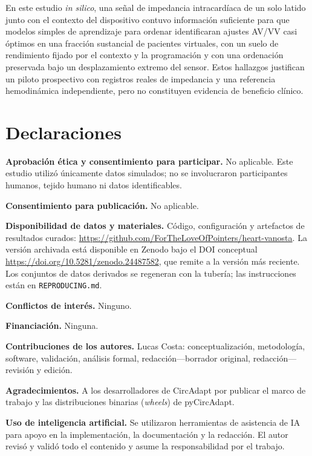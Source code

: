 \documentclass[11pt,a4paper]{article}
\begin{document}
En este estudio \emph{in silico}, una señal de impedancia intracardíaca de un solo
latido junto con el contexto del dispositivo contuvo información suficiente para
que modelos simples de aprendizaje para ordenar identificaran ajustes AV/VV casi
óptimos en una fracción sustancial de pacientes virtuales, con un suelo de
rendimiento fijado por el contexto y la programación y con una ordenación
preservada bajo un desplazamiento extremo del sensor. Estos hallazgos justifican
un piloto prospectivo con registros reales de impedancia y una referencia
hemodinámica independiente, pero no constituyen evidencia de beneficio clínico.

\section*{Declaraciones}

\noindent\textbf{Aprobación ética y consentimiento para participar.} No
aplicable. Este estudio utilizó únicamente datos simulados; no se involucraron
participantes humanos, tejido humano ni datos identificables.

\noindent\textbf{Consentimiento para publicación.} No aplicable.

\noindent\textbf{Disponibilidad de datos y materiales.} Código, configuración y
artefactos de resultados curados:
\url{https://github.com/ForTheLoveOfPointers/heart-vanosta}. La versión archivada
está disponible en Zenodo bajo el DOI conceptual
\url{https://doi.org/10.5281/zenodo.24487582}, que remite a la versión más
reciente. Los conjuntos de datos derivados se regeneran con la tubería; las
instrucciones están en \texttt{REPRODUCING.md}.

\noindent\textbf{Conflictos de interés.} Ninguno.

\noindent\textbf{Financiación.} Ninguna.

\noindent\textbf{Contribuciones de los autores.} Lucas Costa: conceptualización,
metodología, software, validación, análisis formal, redacción---borrador
original, redacción---revisión y edición.

\noindent\textbf{Agradecimientos.} A los desarrolladores de CircAdapt por
publicar el marco de trabajo y las distribuciones binarias (\emph{wheels}) de
pyCircAdapt.

\noindent\textbf{Uso de inteligencia artificial.} Se utilizaron herramientas de
asistencia de IA para apoyo en la implementación, la documentación y la
redacción. El autor revisó y validó todo el contenido y asume la responsabilidad
por el trabajo.
\end{document}
